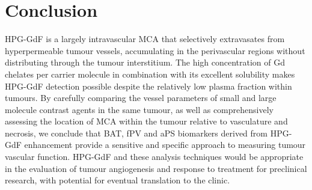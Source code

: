 \section{Conclusion}

HPG-GdF is a largely intravascular MCA that selectively extravasates from hyperpermeable tumour vessels, accumulating in the perivascular regions without distributing through the tumour interstitium.
The high concentration of Gd chelates per carrier molecule in combination with its excellent solubility makes \acs{HPG-GdF} detection possible despite the relatively low plasma fraction within tumours.
By carefully comparing the vessel parameters of small and large molecule contrast agents in the same tumour, as well as comprehensively assessing the location of MCA within the tumour relative to vasculature and necrosis, we conclude that \acs{BAT}, \acs{fPV} and \acs{aPS} biomarkers derived from \acs{HPG-GdF} enhancement provide a sensitive and specific approach to measuring tumour vascular function.
\acs{HPG-GdF} and these analysis techniques would be appropriate in the evaluation of tumour angiogenesis and response to treatment for preclinical research, with potential for eventual translation to the clinic.

\endinput
